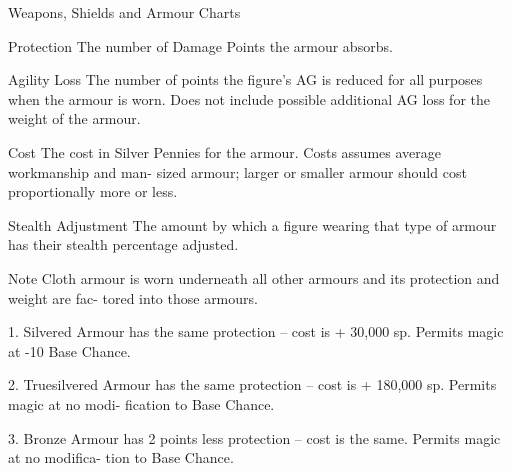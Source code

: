 \begin{Table}{Weapons, Shields and Armour Charts}
 

Protection  The  number  of  Damage  Points  the 
armour absorbs. 

Agility  Loss  The  number  of  points  the  figure’s 
AG is reduced for all purposes when the armour 
is worn. Does not include possible additional AG 
loss for the weight of the armour. 

Cost  The  cost  in  Silver  Pennies  for  the  armour. 
Costs  assumes  average  workmanship  and  man-
sized  armour;  larger  or  smaller  armour  should 
cost proportionally more or less. 

Stealth  Adjustment  The  amount  by  which  a 
figure  wearing  that  type  of  armour  has  their 
stealth percentage adjusted. 

Note  Cloth  armour  is  worn  underneath  all  other 
armours  and  its  protection  and  weight  are  fac-
tored into those armours. 

1.  Silvered  Armour  has  the  same  protection  – 
cost  is  +  30,000  sp.  Permits  magic  at  -10%
Base Chance. 

2.  Truesilvered  Armour  has  the  same  protection 
– cost is + 180,000 sp. Permits magic at no modi-
fication to Base Chance. 

3. Bronze  Armour  has 2 points  less  protection – 
cost  is  the  same.  Permits  magic  at  no  modifica-
tion to Base Chance. 

\end{Table}
